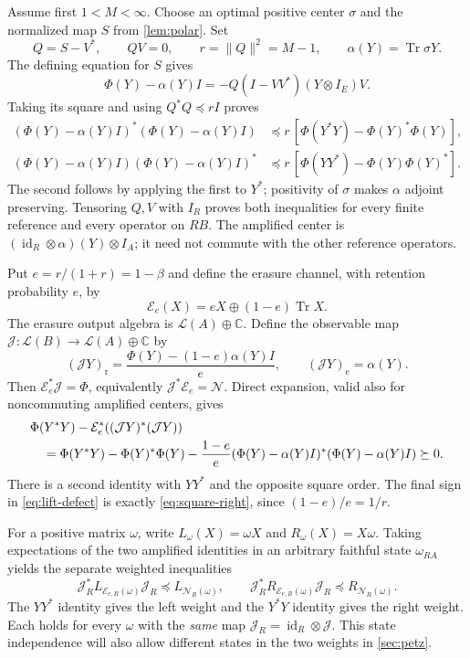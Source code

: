 \documentclass[11pt]{article}
\numberwithin{equation}{section}
\theoremstyle{definition}
\theoremstyle{remark}
\DeclareMathOperator{\Tr}{Tr}
\DeclareMathOperator{\id}{id}
\newcommand{\N}{\mathcal N}
\newcommand{\E}{\mathcal E}
\newcommand{\norm}[1]{\lVert #1\rVert}
\begin{document}
Assume first $1<M<\infty$. Choose an optimal positive center $\sigma$ and
the normalized map $S$ from \cref{lem:polar}. Set
\[
 Q=S-V^*,\qquad QV=0,\qquad
 r=\norm Q^2=M-1,\qquad \alpha(Y)=\Tr\sigma Y.
\]
The defining equation for $S$ gives
\[
 \Phi(Y)-\alpha(Y)I
 =-Q(I-VV^*)(Y\otimes I_E)V.
\]
Taking its square and using $Q^*Q\preceq rI$ proves
\begin{align}
 (\Phi(Y)-\alpha(Y)I)^*(\Phi(Y)-\alpha(Y)I)
 &\preceq r\,[\Phi(Y^*Y)-\Phi(Y)^*\Phi(Y)], \label{eq:square-right}\\
 (\Phi(Y)-\alpha(Y)I)(\Phi(Y)-\alpha(Y)I)^*
 &\preceq r\,[\Phi(YY^*)-\Phi(Y)\Phi(Y)^*]. \label{eq:square-left}
\end{align}
The second follows by applying the first to $Y^*$; positivity of $\sigma$
makes $\alpha$ adjoint preserving. Tensoring $Q,V$ with $I_R$ proves both
inequalities for every finite reference and every operator on $RB$.
The amplified center is $(\id_R\otimes\alpha)(Y)\otimes I_A$; it need
not commute with the other reference operators.

Put $e=r/(1+r)=1-\beta$ and define the erasure channel, with retention
probability $e$, by
\[
 \E_e(X)=eX\oplus(1-e)\Tr X.
\]
The erasure output algebra is $\mathcal L(A)\oplus\mathbb C$.
Define the observable map $\mathcal J:\mathcal L(B)\to
\mathcal L(A)\oplus\mathbb C$ by
\begin{equation}
 (\mathcal JY)_{\mathrm r}
 =\frac{\Phi(Y)-(1-e)\alpha(Y)I}{e},
 \qquad
 (\mathcal JY)_{\mathrm e}=\alpha(Y).
 \label{eq:signed-lift}
\end{equation}
Then $\E_e^*\mathcal J=\Phi$, equivalently $\mathcal J^*\E_e=\N$.
Direct expansion, valid also for noncommuting amplified centers, gives
\begin{align}
 &\Phi(Y^*Y)-\E_e^*((\mathcal JY)^*(\mathcal JY)) \notag\\
 &\quad=
 \Phi(Y^*Y)-\Phi(Y)^*\Phi(Y)
 -\frac{1-e}{e}(\Phi(Y)-\alpha(Y)I)^*
                         (\Phi(Y)-\alpha(Y)I)\succeq0 .
 \label{eq:lift-defect}
\end{align}
There is a second identity with $YY^*$ and the opposite square order.
The final sign in \eqref{eq:lift-defect} is exactly
\eqref{eq:square-right}, since $(1-e)/e=1/r$.

For a positive matrix $\omega$, write
$L_\omega(X)=\omega X$ and $R_\omega(X)=X\omega$.
Taking expectations of the two amplified identities in an arbitrary faithful
state $\omega_{RA}$ yields the separate weighted inequalities
\begin{equation}
 \mathcal J_R^* L_{\E_{e,R}(\omega)}\mathcal J_R
       \preceq L_{\N_R(\omega)},\qquad
 \mathcal J_R^* R_{\E_{e,R}(\omega)}\mathcal J_R
       \preceq R_{\N_R(\omega)} .
 \label{eq:two-weights}
\end{equation}
The $YY^*$ identity gives the left weight and the $Y^*Y$ identity gives
the right weight. Each holds for every $\omega$ with the \emph{same} map
$\mathcal J_R=\id_R\otimes\mathcal J$. This state independence will also
allow different states in the two weights in \cref{sec:petz}.
\end{document}
